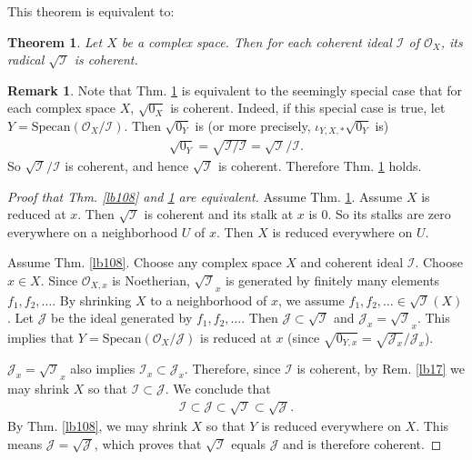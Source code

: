 \documentclass[12pt,b5paper,notitlepage]{report}
\theoremstyle{definition}
\newtheorem{rem}[df]{Remark}
\theoremstyle{plain}
\newtheorem{thm}[df]{Theorem}
\newcommand{\mc}{\mathcal}
\newcommand{\scr}{\mathscr}
\newcommand{\Specan}{\mathrm{Specan}}
\numberwithin{equation}{section}
\begin{document}
This theorem is equivalent to:

\begin{thm}\label{lb109}
Let $X$ be a complex space. Then for each coherent ideal $\mc I$ of $\scr O_X$, its radical $\sqrt{\mc I}$ is coherent.
\end{thm}


\begin{rem}
Note that Thm. \ref{lb109} is equivalent to the seemingly special case that for each complex space $X$, $\sqrt{0_X}$ is coherent. Indeed, if this special case is true, let $Y=\Specan(\scr O_X/\mc I)$. Then $\sqrt{0_Y}$ is (or more precisely, $\iota_{Y,X,*}\sqrt{0_Y}$ is)
\begin{align}
\sqrt{0_Y}=\sqrt{\mc I/\mc I}=\sqrt{\mc I}/\mc I.
\end{align}
So $\sqrt{\mc I}/\mc I$ is coherent, and hence $\sqrt{\mc I}$ is coherent. Therefore Thm. \ref{lb109} holds.
\end{rem}


\begin{proof}[Proof that Thm. \ref{lb108} and \ref{lb109} are equivalent]
Assume Thm. \ref{lb109}. Assume $X$ is reduced at $x$. Then $\sqrt{\mc I}$ is coherent and its stalk at $x$ is $0$. So its stalks are zero everywhere on a neighborhood $U$ of $x$. Then $X$ is reduced everywhere on $U$.

Assume Thm. \ref{lb108}. Choose any complex space $X$ and coherent ideal $\mc I$. Choose $x\in X$. Since $\scr O_{X,x}$ is Noetherian, $\sqrt{\mc I}_x$ is generated by finitely many elements $f_1,f_2,\dots$. By shrinking $X$ to a neighborhood of $x$, we assume $f_1,f_2,\dots\in\sqrt{\mc I}(X)$. Let $\mc J$ be the ideal generated by $f_1,f_2,\dots$. Then $\mc J\subset\sqrt{\mc I}$ and $\mc J_x=\sqrt{\mc I}_x$. This implies that  $Y=\Specan(\scr O_X/\mc J)$ is reduced at $x$ (since $\sqrt{0_{Y,x}}=\sqrt{\mc J_x}/\mc J_x$). 

$\mc J_x=\sqrt{\mc I}_x$ also implies $\mc I_x\subset\mc J_x$. Therefore, since $\mc I$ is coherent, by Rem. \ref{lb17} we may shrink $X$ so that $\mc I\subset\mc J$. We conclude that
\begin{align*}
\mc I\subset\mc J\subset\sqrt{\mc I}\subset \sqrt{\mc J}.
\end{align*}
By Thm. \ref{lb108}, we may shrink $X$ so that $Y$ is reduced everywhere on $X$. This means $\mc J=\sqrt{\mc J}$, which proves that $\sqrt{\mc I}$ equals $\mc J$ and is therefore coherent.
\end{proof}
\end{document}
